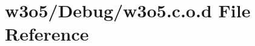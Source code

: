 \hypertarget{w3o5_8c_8o_8d}{}\section{w3o5/\+Debug/w3o5.c.\+o.\+d File Reference}
\label{w3o5_8c_8o_8d}
